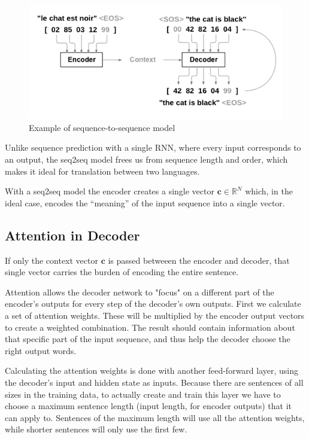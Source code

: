 \documentclass[journal, a4paper]{IEEEtran}
\begin{document}
\begin{figure}[htb]
    \includegraphics[width=\linewidth]{figures/seq2seq.png}
    \caption{Example of sequence-to-sequence model}
    \label{figure:seq2seq}
\end{figure}

Unlike sequence prediction with a single RNN, where every input corresponds to an output, the seq2seq model frees us from sequence length and order, which makes it ideal for translation between two languages.

With a seq2seq model the encoder creates a single vector $\mathbf{c}\in\mathbb{R}^N$ which, in the ideal case, encodes the “meaning” of the input sequence into a single vector.

\subsection{Attention in Decoder}

If only the context vector $\mathbf{c}$ is passed betweeen the encoder and decoder, that single vector carries the burden of encoding the entire sentence.

Attention allows the decoder network to "focus" on a different part of the encoder’s outputs for every step of the decoder’s own outputs. First we calculate a set of attention weights. These will be multiplied by the encoder output vectors to create a weighted combination. The result should contain information about that specific part of the input sequence, and thus help the decoder choose the right output words.

Calculating the attention weights is done with another feed-forward layer, using the decoder’s input and hidden state as inputs. Because there are sentences of all sizes in the training data, to actually create and train this layer we have to choose a maximum sentence length (input length, for encoder outputs) that it can apply to. Sentences of the maximum length will use all the attention weights, while shorter sentences will only use the first few.
\end{document}
